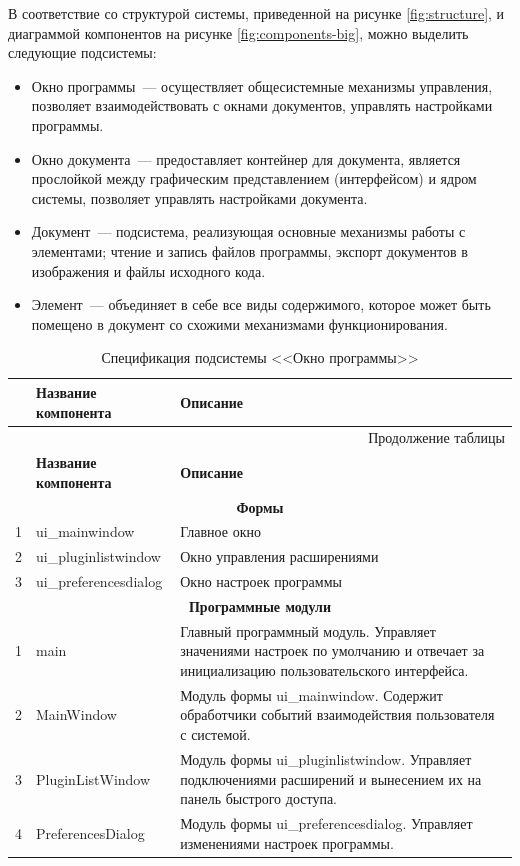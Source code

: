 В соответствие со структурой системы, приведенной на рисунке \ref{fig:structure}, и диаграммой компонентов на рисунке \ref{fig:components-big}, можно выделить следующие подсистемы:
\begin{itemize}
  \item Окно программы~--- осуществляет общесистемные механизмы управления, позволяет взаимодействовать с окнами документов, управлять настройками программы.
  \item Окно документа~--- предоставляет контейнер для документа, является прослойкой между графическим представлением (интерфейсом) и ядром системы, позволяет управлять настройками документа.
  \item Документ~--- подсистема, реализующая основные механизмы работы с элементами; чтение и запись файлов программы, экспорт документов в изображения и файлы исходного кода.
  \item Элемент~--- объединяет в себе все виды содержимого, которое может быть помещено в документ со схожими механизмами функционирования.
\end{itemize}

\small
\singlespacing
\begin{longtable}[h]{|p{}|p{}|p{}|}
  \caption{Спецификация подсистемы <<Окно программы>>}
	\\ \hline
	  \textbf{\No}                  &
	  \textbf{Название компонента}  &
	  \textbf{Описание}
	\\ \hline
  \endfirsthead

  \multicolumn{3}{r}{Продолжение таблицы \thetable{}}
  \\ \hline
	  \textbf{\No}                  &
	  \textbf{Название компонента}  &
	  \textbf{Описание}
	\\ \hline
  \endhead

  \multicolumn{3}{|c|}{\textbf{Формы}} \\
  \hline
  1 & ui\_mainwindow        & Главное окно                 \\ \hline
  2 & ui\_pluginlistwindow  & Окно управления расширениями \\ \hline
  3 & ui\_preferencesdialog & Окно настроек программы      \\ \hline

  \multicolumn{3}{|c|}{\textbf{Программные модули}} \\
  \hline
  1 & main        & Главный программный модуль. Управляет значениями настроек по умолчанию и отвечает за инициализацию пользовательского интерфейса. \\ \hline
  2 & MainWindow  & Модуль формы ui\_mainwindow. Содержит обработчики событий взаимодействия пользователя с системой. \\ \hline
  3 & PluginListWindow & Модуль формы ui\_pluginlistwindow. Управляет подключениями расширений и вынесением их на панель быстрого доступа. \\ \hline
  4 & PreferencesDialog & Модуль формы ui\_preferencesdialog. Управляет изменениями настроек программы. \\ \hline
\end{longtable}
\normalsize
\onehalfspacing

